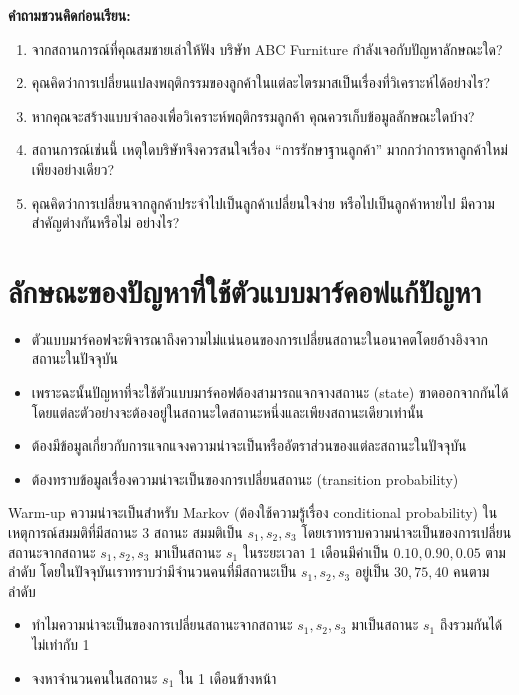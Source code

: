 \vspace{1em}
\noindent
\textbf{คำถามชวนคิดก่อนเรียน:}
\begin{enumerate}
    \item จากสถานการณ์ที่คุณสมชายเล่าให้ฟัง บริษัท ABC Furniture กำลังเจอกับปัญหาลักษณะใด?
    \item คุณคิดว่าการเปลี่ยนแปลงพฤติกรรมของลูกค้าในแต่ละไตรมาสเป็นเรื่องที่วิเคราะห์ได้อย่างไร?
    \item หากคุณจะสร้างแบบจำลองเพื่อวิเคราะห์พฤติกรรมลูกค้า คุณควรเก็บข้อมูลลักษณะใดบ้าง?
    \item สถานการณ์เช่นนี้ เหตุใดบริษัทจึงควรสนใจเรื่อง “การรักษาฐานลูกค้า” มากกว่าการหาลูกค้าใหม่เพียงอย่างเดียว?
    \item คุณคิดว่าการเปลี่ยนจากลูกค้าประจำไปเป็นลูกค้าเปลี่ยนใจง่าย หรือไปเป็นลูกค้าหายไป มีความสำคัญต่างกันหรือไม่ อย่างไร?
\end{enumerate}

\newpage
\section{ลักษณะของปัญหาที่ใช้ตัวแบบมาร์คอฟแก้ปัญหา}
\begin{itemize}
    \item ตัวแบบมาร์คอฟจะพิจารณาถึงความไม่แน่นอนของการเปลี่ยนสถานะในอนาคตโดยอ้างอิงจากสถานะในปัจจุบัน
    \item เพราะฉะนั้นปัญหาที่จะใช้ตัวแบบมาร์คอฟต้องสามารถแจกจางสถานะ (state) ขาดออกจากกันได้ โดยแต่ละตัวอย่างจะต้องอยู่ในสถานะใดสถานะหนึ่งและเพียงสถานะเดียวเท่านั้น
    \item ต้องมีข้อมูลเกี่ยวกับการแจกแจงความน่าจะเป็นหรืออัตราส่วนของแต่ละสถานะในปัจจุบัน
    \item ต้องทราบข้อมูลเรื่องความน่าจะเป็นของการเปลี่ยนสถานะ (transition probability)
\end{itemize}

\begin{example}
    {Warm-up ความน่าจะเป็นสำหรับ Markov (ต้องใช้ความรู้เรื่อง conditional probability)}{}
    ในเหตุการณ์สมมติที่มีสถานะ 3 สถานะ สมมติเป็น $s_1, s_2, s_3$ โดยเราทราบความน่าจะเป็นของการเปลี่ยนสถานะจากสถานะ $s_1, s_2, s_3$ มาเป็นสถานะ $s_1$ ในระยะเวลา 1 เดือนมีค่าเป็น $0.10, 0.90, 0.05$ ตามลำดับ โดยในปัจจุบันเราทราบว่ามีจำนวนคนที่มีสถานะเป็น $s_1, s_2, s_3$ อยู่เป็น $30,75,40$ คนตามลำดับ
    \begin{itemize}
        \item ทำไมความน่าจะเป็นของการเปลี่ยนสถานะจากสถานะ $s_1, s_2, s_3$ มาเป็นสถานะ $s_1$ ถึงรวมกันได้ไม่เท่ากับ 1
        \item จงหาจำนวนคนในสถานะ $s_1$ ใน 1 เดือนข้างหน้า
    \end{itemize}
\end{example}
\newpage
